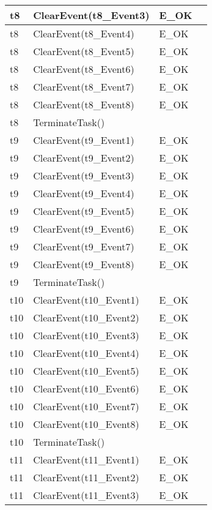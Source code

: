 \documentclass[10pt]{article}
\newlength{\Li}\settowidth{\Li}{Running}
\newlength{\Lii}\setlength{\Lii}{7cm}
\newlength{\Liiii}\setlength{\Liiii}{0.9cm}
\newlength{\Liii}\setlength{\Liii}{\textwidth} \addtolength{\Liii}{-\Li} \addtolength{\Liii}{-\Lii} \addtolength{\Liii}{-\Liiii}
\begin{document}
\begin{supertabular}{|p{\Li}|p{\Lii}|p{\Liii}|p{\Liiii}|}
	t8	& ClearEvent(t8\_Event3)		& E\_OK				& \\ \hline 
	t8	& ClearEvent(t8\_Event4)		& E\_OK				& \\ \hline 
	t8	& ClearEvent(t8\_Event5)		& E\_OK				& \\ \hline 
	t8	& ClearEvent(t8\_Event6)		& E\_OK				& \\ \hline 
	t8	& ClearEvent(t8\_Event7)		& E\_OK				& \\ \hline 
	t8	& ClearEvent(t8\_Event8)		& E\_OK				& \\ \hline 
	t8	& TerminateTask()				&					&  \\ \hline
	t9	& ClearEvent(t9\_Event1)		& E\_OK				& \\ \hline 
	t9	& ClearEvent(t9\_Event2)		& E\_OK				& \\ \hline 
	t9	& ClearEvent(t9\_Event3)		& E\_OK				& \\ \hline 
	t9	& ClearEvent(t9\_Event4)		& E\_OK				& \\ \hline 
	t9	& ClearEvent(t9\_Event5)		& E\_OK				& \\ \hline 
	t9	& ClearEvent(t9\_Event6)		& E\_OK				& \\ \hline 
	t9	& ClearEvent(t9\_Event7)		& E\_OK				& \\ \hline 
	t9	& ClearEvent(t9\_Event8)		& E\_OK				& \\ \hline 
	t9	& TerminateTask()				&					&  \\ \hline
	t10	& ClearEvent(t10\_Event1)		& E\_OK				& \\ \hline 
	t10	& ClearEvent(t10\_Event2)		& E\_OK				& \\ \hline 
	t10	& ClearEvent(t10\_Event3)		& E\_OK				& \\ \hline 
	t10	& ClearEvent(t10\_Event4)		& E\_OK				& \\ \hline 
	t10	& ClearEvent(t10\_Event5)		& E\_OK				& \\ \hline 
	t10	& ClearEvent(t10\_Event6)		& E\_OK				& \\ \hline 
	t10	& ClearEvent(t10\_Event7)		& E\_OK				& \\ \hline 
	t10	& ClearEvent(t10\_Event8)		& E\_OK				& \\ \hline 
	t10	& TerminateTask()				&					&  \\ \hline
	t11	& ClearEvent(t11\_Event1)		& E\_OK				& \\ \hline 
	t11	& ClearEvent(t11\_Event2)		& E\_OK				& \\ \hline 
	t11	& ClearEvent(t11\_Event3)		& E\_OK				& \\ \hline 

\end{supertabular}
\end{document}

